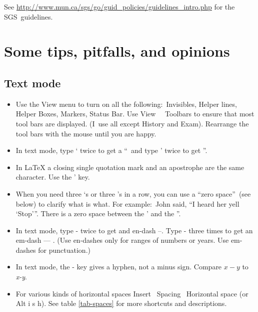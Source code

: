 See \url{http://www.mun.ca/sgs/go/guid_policies/guidelines_intro.php} for
the SGS\ guidelines.

\section{Some tips, pitfalls, and opinions}

\label{sec:hints}

\subsection{Text mode}

\begin{itemize}
\item Use the View menu to turn on all the following:\ Invisibles, Helper
lines, Helper Boxes, Markers, Status Bar. Use View\ \TEXTsymbol{>}%
\TEXTsymbol{>}\ Toolbars to ensure that most tool bars are displayed. (I\
use all except History and Exam). Rearrange the tool bars with the mouse
until you are happy.

\item In text mode, type ` twice to get a \textquotedblleft\ and type '
twice to get \textquotedblright .

\item In LaTeX a closing single quotation mark and an apostrophe are the
same character. Use the ' key.

\item When you need three `s or three 's in a row, you can use a
\textquotedblleft zero space\textquotedblright\ (see below) to clarify what
is what. For example:\ John said, \textquotedblleft I heard her yell
`Stop'{}\textquotedblright . There is a zero space between the ' and the
\textquotedblright .

\item In text mode, type - twice to get and en-dash --. Type - three times
to get an em-dash --- . (Use en-dashes only for ranges of numbers or years.
Use em-dashes for punctuation.)

\item In text mode, the - key gives a hyphen, not a minus sign. Compare $x-y$
to \textit{x-y}.

\item For various kinds of horizontal spaces Insert \TEXTsymbol{>}%
\TEXTsymbol{>}\ Spacing \TEXTsymbol{>}\TEXTsymbol{>}\ Horizontal space (or
Alt i s h). See table \ref{tab-spaces} for more shortcuts and descriptions.


\end{itemize}
